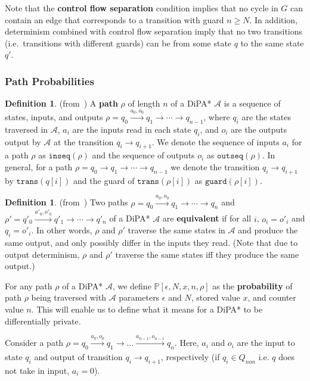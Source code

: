 \documentclass[12pt]{article}
\newcommand{\PP}{\mathbb{P}}
\theoremstyle{definition}
\newtheorem{defn}[thm]{Definition}
\begin{document}
Note that the \textbf{control flow separation} condition implies that no cycle in $G$ can contain an edge that corresponds to a transition with guard $n\geq N$. In addition, determinism combined with control flow separation imply that no two transitions (i.e.\ transitions with different guards) can be from some state $q$ to the same state $q'$. 

\subsubsection{Path Probabilities}


\begin{defn} (from~\cite{chadhaLinearTimeDecidability2021})
	A \textbf{path} $\rho$ of length $n$ of a DiPA* $\mathcal{A}$ is a sequence of states, inputs, and outputs $\rho = q_0\xrightarrow{a_0, o_0} q_1\to\cdots \to q_{n-1}$, where $q_i$ are the states traversed in $\mathcal{A}$, $a_i$ are the inputs read in each state $q_i$, and $o_i$ are the outputs output by $\mathcal{A}$ at the transition $q_i\to q_{i+1}$. 
	We denote the sequence of inputs $a_i$ for a path $\rho$ as $\texttt{inseq}(\rho)$ and the sequence of outputs $o_i$ as $\texttt{outseq}(\rho)$. In general, for a path $\rho = q_0\to q_1\to \cdots \to q_{n-1}$ we denote the transition $q_i\to q_{i+1}$ by $\texttt{trans}(q[i])$ and the guard of $\texttt{trans}(\rho[i])$ as $\texttt{guard}(\rho[i])$.
\end{defn}

\begin{defn} (from~\cite{chadhaLinearTimeDecidability2021})
	Two paths $\rho = q_0\xrightarrow{a_0, o_0} q_1\to\cdots \to q_n$ and $\rho' = q'_0 \xrightarrow{a'_0, o'_0} q'_1 \to \cdots \to q'_n$ of a DiPA* $\mathcal{A}$ are \textbf{equivalent} if for all $i$, $o_i = o'_i$ and $q_i = o'_i$. In other words, $\rho$ and $\rho'$ traverse the same states in $\mathcal{A}$ and produce the same output, and only possibly differ in the inputs they read.
	(Note that due to output determinism, $\rho$ and $\rho'$ traverse the same states iff they produce the same output.)
\end{defn}

For any path $\rho$ of a DiPA* $\mathcal{A}$, we define $\PP[\epsilon, N, x, n, \rho]$ as the \textbf{probability} of path $\rho$ being traversed with $\mathcal{A}$ parameters $\epsilon$ and $N$, stored value $x$, and counter value $n$. This will enable us to define what it means for a DiPA* to be differentially private.

Consider a path $\rho = q_0\xrightarrow[]{a_0, o_0}q_1\rightarrow\ldots\xrightarrow[]{a_{n-1}, o_{n-1}} q_n$. Here, $a_i$ and $o_i$ are the input to state $q_i$ and output of transition $q_i\to q_{i+1}$, respectively (if $q_i\in Q_{non}$ i.e. $q$ does not take in input, $a_i = 0$).
\end{document}
